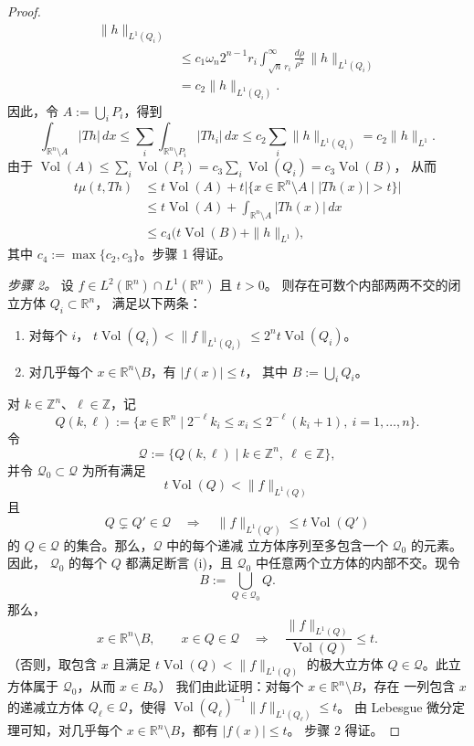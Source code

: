 \begin{proof}
\begin{align*}
    \|h\|_{L^1(Q_i)}\\
  &\le c_1\omega_n2^{n-1}r_i
    \int_{\sqrt n\,r_i}^{\infty}\frac{d\rho}{\rho^2}\,
    \|h\|_{L^1(Q_i)}\\
  &=c_2\|h\|_{L^1(Q_i)}.
\end{align*}
因此，令 $A:=\bigcup_iP_i$，得到
\[
  \int_{\mathbb R^n\setminus A}|Th|\,dx
  \le\sum_i\int_{\mathbb R^n\setminus P_i}|Th_i|\,dx
  \le c_2\sum_i\|h\|_{L^1(Q_i)}
  =c_2\|h\|_{L^1}.
\]
由于
$\operatorname{Vol}(A)\le\sum_i\operatorname{Vol}(P_i)
=c_3\sum_i\operatorname{Vol}(Q_i)=c_3\operatorname{Vol}(B)$，
从而
\begin{align*}
  t\mu(t,Th)
  &\le t\operatorname{Vol}(A)
    +t\bigl|\{x\in\mathbb R^n\setminus A\mid |Th(x)|>t\}\bigr|\\
  &\le t\operatorname{Vol}(A)
    +\int_{\mathbb R^n\setminus A}|Th(x)|\,dx\\
  &\le c_4\bigl(t\operatorname{Vol}(B)+\|h\|_{L^1}\bigr),
\end{align*}
其中 $c_4:=\max\{c_2,c_3\}$。步骤 1 得证。

\emph{步骤 2。}
设 $f\in L^2(\mathbb R^n)\cap L^1(\mathbb R^n)$ 且 $t>0$。
则存在可数个内部两两不交的闭立方体 $Q_i\subset\mathbb R^n$，
满足以下两条：
\begin{enumerate}[label=(\roman*)]
\item 对每个 $i$，
$t\operatorname{Vol}(Q_i)<\|f\|_{L^1(Q_i)}
\le2^nt\operatorname{Vol}(Q_i)$。
\item 对几乎每个 $x\in\mathbb R^n\setminus B$，有 $|f(x)|\le t$，
其中 $B:=\bigcup_iQ_i$。
\end{enumerate}
对 $k\in\mathbb Z^n$、$\ell\in\mathbb Z$，记
\[
  Q(k,\ell):=
  \bigl\{x\in\mathbb R^n\mid
    2^{-\ell}k_i\le x_i\le2^{-\ell}(k_i+1),
    \ i=1,\ldots,n\bigr\}.
\]
令
\[
  \mathcal Q:=\{Q(k,\ell)\mid k\in\mathbb Z^n,\ \ell\in\mathbb Z\},
\]
并令 $\mathcal Q_0\subset\mathcal Q$ 为所有满足
\[
  t\operatorname{Vol}(Q)<\|f\|_{L^1(Q)}
\]
且
\[
  Q\subsetneq Q'\in\mathcal Q
  \quad\Longrightarrow\quad
  \|f\|_{L^1(Q')}\le t\operatorname{Vol}(Q')
\]
的 $Q\in\mathcal Q$ 的集合。那么，$\mathcal Q$ 中的每个递减
立方体序列至多包含一个 $\mathcal Q_0$ 的元素。因此，
$\mathcal Q_0$ 的每个 $Q$ 都满足断言 (i)，且 $\mathcal Q_0$
中任意两个立方体的内部不交。现令
\[
  B:=\bigcup_{Q\in\mathcal Q_0}Q.
\]
那么，
\[
  x\in\mathbb R^n\setminus B,\qquad
  x\in Q\in\mathcal Q
  \quad\Longrightarrow\quad
  \frac{\|f\|_{L^1(Q)}}{\operatorname{Vol}(Q)}\le t.
\]
（否则，取包含 $x$ 且满足
$t\operatorname{Vol}(Q)<\|f\|_{L^1(Q)}$ 的极大立方体
$Q\in\mathcal Q$。此立方体属于 $\mathcal Q_0$，从而 $x\in B$。）
我们由此证明：对每个 $x\in\mathbb R^n\setminus B$，存在
一列包含 $x$ 的递减立方体 $Q_\ell\in\mathcal Q$，使得
$\operatorname{Vol}(Q_\ell)^{-1}\|f\|_{L^1(Q_\ell)}\le t$。
由 Lebesgue 微分定理可知，对几乎每个
$x\in\mathbb R^n\setminus B$，都有 $|f(x)|\le t$。
步骤 2 得证。


\end{proof}
